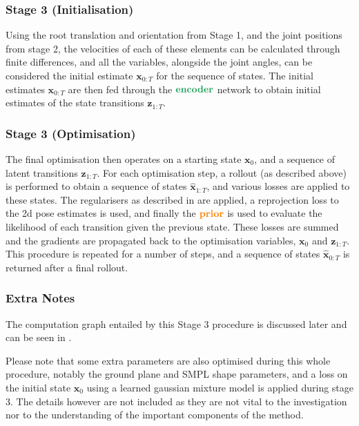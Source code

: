 \subsubsection{Stage 3 (Initialisation)}
Using the root translation and orientation from Stage 1, and the joint positions from stage 2, the velocities of each of these elements can be calculated through finite differences, and all the variables, alongside the joint angles, can be considered the initial estimate $\mathbf{x}_{0:T}$ for the sequence of states. The initial estimates $\mathbf{x}_{0:T}$ are then fed through the $\textbf{\textcolor{ForestGreen}{encoder}}$ network to obtain initial estimates of the state transitions $\textbf{z}_{1:T}$.

\subsubsection{Stage 3 (Optimisation)}
The final optimisation then operates on a starting state $\mathbf{x}_0$, and a sequence of latent transitions $\textbf{z}_{1:T}$. For each optimisation step, a rollout (as described above) is performed to obtain a sequence of states $\mathbf{\hat{x}}_{1:T}$, and various losses are applied to these states. The regularisers as described in  are applied, a reprojection loss to the 2d pose estimates is used, and finally the $\textbf{\textcolor{orange}{prior}}$ is used to evaluate the likelihood of each transition given the previous state. These losses are summed and the gradients are propagated back to the optimisation variables, $\mathbf{x}_0$ and $\textbf{z}_{1:T}$. This procedure is repeated for a number of steps, and a sequence of states $\mathbf{\hat{x}}_{0:T}$ is returned after a final rollout.


\subsubsection{Extra Notes}
\label{sec:humor_testops_extra_notes}

The computation graph entailed by this Stage 3 procedure is discussed later and can be seen in .

Please note that some extra parameters are also optimised during this whole procedure, notably the ground plane and SMPL shape parameters, and a loss on the initial state $\mathbf{x}_0$ using a learned gaussian mixture model is applied during stage 3. The details however are not included as they are not vital to the investigation nor to the understanding of the important components of the method.